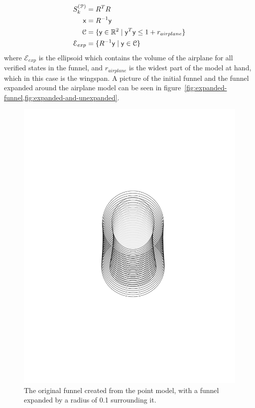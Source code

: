 \begin{align*}
  S_{k}^{(\mathcal{P})} &= R^{T}R \\
  {\mathbf{\mathsf{x}}} &= R^{-1}{\mathbf{\mathsf{y}}} \\
  \mathcal{C} &= \lbrace{\mathbf{\mathsf{y}}} \in \mathbb{R}^2 \mid {\mathbf{\mathsf{y}}}^{T}{\mathbf{\mathsf{y}}} \leq 1 + r_{airplane}\rbrace \\
  \mathcal{E}_{exp} &= \lbrace R^{-1}{\mathbf{\mathsf{y}}} \mid {\mathbf{\mathsf{y}}} \in \mathcal{C}\rbrace \\
\end{align*}
where \(\mathcal{E}_{exp}\) is the ellipsoid which contains the volume of the
airplane for all verified states in the funnel, and \(r_{airplane}\) is the
widest part of the model at hand, which in this case is the wingspan. A picture
of the initial funnel and the funnel expanded around the airplane model can be
seen in figure~\cref{fig:expanded-funnel,fig:expanded-and-unexpanded}.

\begin{figure}
  \centering \includegraphics[clip, trim=6cm 8cm 6cm 8cm,
  scale=.5]{figures/method/expanded-funnel}
  \caption{The original funnel created from the point model, with a funnel
    expanded by a radius of 0.1 surrounding it.}
  \label{fig:expanded-funnel}
\end{figure}


